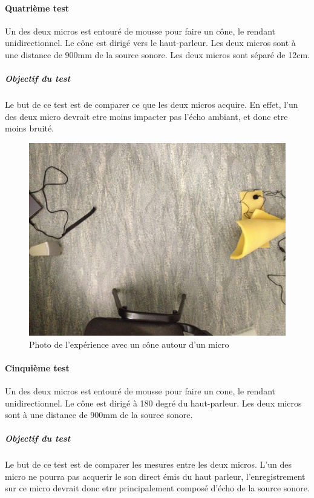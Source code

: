  \paragraph{Quatrième test} 
 Un des deux micros est entouré de mousse pour faire un cône, le rendant unidirectionnel. Le cône est dirigé vers le haut-parleur. Les deux micros sont à une distance de 900mm de la source sonore. Les deux micros sont séparé de 12cm.
 \subparagraph{Objectif du test}
 Le but de ce test est de comparer ce que les deux micros acquire. En effet, l'un des deux micro devrait etre moins impacter pas l'écho ambiant, et donc etre moins bruité.
 \begin{figure}[H]
 \includegraphics[width=\textwidth]{../tests/lecture_de_signaux_carres/donnees11-03/test_4.jpg} 
 \caption{Photo de l'expérience avec un cône autour d'un micro}
 \end{figure}
 	
 \paragraph{Cinquième test} 
 Un des deux micros est entouré de mousse pour faire un cone, le rendant unidirectionnel. Le cône est dirigé à 180 degré du haut-parleur. Les deux micros sont à une distance de 900mm de la source sonore.
 \subparagraph{Objectif du test}
 Le but de ce test est de comparer les mesures entre les deux micros. L'un des micro ne pourra pas acquerir le son direct émis du haut parleur, l'enregistrement sur ce micro devrait donc etre principalement composé d'écho de la source sonore.
 



